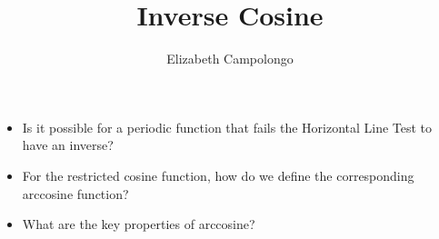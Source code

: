 \documentclass{ximera}
\author{Elizabeth Campolongo}
\title{Inverse Cosine}
\begin{document}
\begin{abstract}
  
\end{abstract}
\maketitle



\begin{motivatingQuestions}\begin{itemize}
\item Is it possible for a periodic function that fails the Horizontal Line Test to have an inverse?
\item For the restricted cosine function, how do we define the corresponding arccosine function?
\item What are the key properties of arccosine?
\end{itemize}\end{motivatingQuestions}





\end{document}
